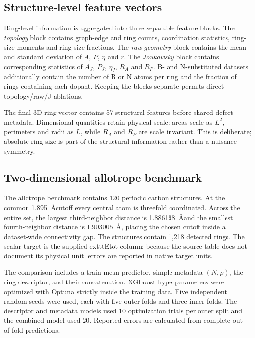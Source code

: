\documentclass[twoside,twocolumn,9pt]{article}
\begin{document}
\subsection*{Structure-level feature vectors}

Ring-level information is aggregated into three separable feature blocks. The \emph{topology} block contains graph-edge and ring counts, coordination statistics, ring-size moments and ring-size fractions. The \emph{raw geometry} block contains the mean and standard deviation of \(A\), \(P\), \(\eta\) and \(r\). The \emph{Joukowsky} block contains corresponding statistics of \(A_J\), \(P_J\), \(\eta_J\), \(R_A\) and \(R_P\). B- and N-substituted datasets additionally contain the number of B or N atoms per ring and the fraction of rings containing each dopant. Keeping the blocks separate permits direct topology/raw/J ablations.

The final 3D ring vector contains 57 structural features before shared defect metadata. Dimensional quantities retain physical scale: areas scale as \(L^2\), perimeters and radii as \(L\), while \(R_A\) and \(R_P\) are scale invariant. This is deliberate; absolute ring size is part of the structural information rather than a nuisance symmetry.

\subsection*{Two-dimensional allotrope benchmark}

The allotrope benchmark contains 120 periodic carbon structures. At the common 1.895~\AA cutoff every central atom is threefold coordinated. Across the entire set, the largest third-neighbor distance is 1.886198~\AA and the smallest fourth-neighbor distance is 1.903005~\AA, placing the chosen cutoff inside a dataset-wide connectivity gap. The structures contain 1,218 detected rings. The scalar target is the supplied 	exttt{Etot} column; because the source table does not document its physical unit, errors are reported in native target units.

The comparison includes a train-mean predictor, simple metadata \((N,\rho)\), the ring descriptor, and their concatenation. XGBoost \cite{Chen2016} hyperparameters were optimized with Optuna \cite{Akiba2019} strictly inside the training data. Five independent random seeds were used, each with five outer folds and three inner folds. The descriptor and metadata models used 10 optimization trials per outer split and the combined model used 20. Reported errors are calculated from complete out-of-fold predictions.
\end{document}
